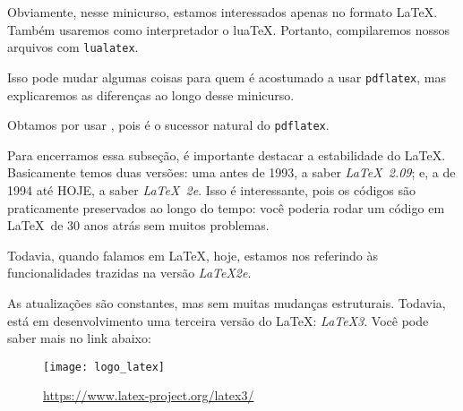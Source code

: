 Obviamente, nesse minicurso, estamos interessados apenas no formato \LaTeX.
Também usaremos como interpretador o lua\TeX.
Portanto, compilaremos nossos arquivos com \texttt{lualatex}.

Isso pode mudar algumas coisas para quem é acostumado a usar \texttt{pdflatex}, 
mas explicaremos as diferenças ao longo desse minicurso.

Obtamos por usar \lualatex, pois é o sucessor natural do \texttt{pdflatex}. 

Para encerramos essa subseção, é importante destacar a estabilidade do \LaTeX.
Basicamente temos duas versões: uma antes de 1993, a saber \textit{LaTeX~2.09}; e,
a de 1994 até HOJE, a saber \textit{LaTeX~2e}.
Isso é interessante, pois os códigos são praticamente preservados ao longo do 
tempo: você poderia rodar um código em \LaTeX\ de 30 anos atrás sem muitos 
problemas.

Todavia, quando falamos em \LaTeX{}, hoje, estamos nos referindo às 
funcionalidades trazidas na versão \textit{\LaTeX2e}.

As atualizações são constantes, mas sem muitas mudanças estruturais.
Todavia, está em desenvolvimento uma terceira versão do \LaTeX: \textit{LaTeX3}.
Você pode saber mais no link abaixo:

\begin{figure}[!htbp]
  \centering
  \texttt{[image: logo\_latex]}
  \caption{\href{https://www.latex-project.org/latex3/}{\textcolor{azulUFRB}{https://www.latex-project.org/latex3/}}}
\end{figure}

 

